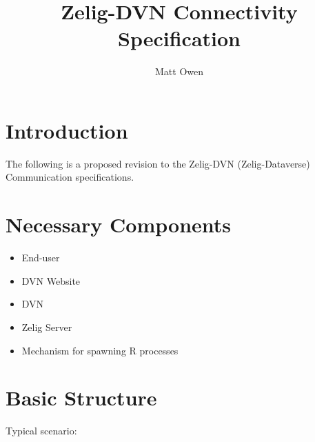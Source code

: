 \documentclass{article}
\title{Zelig-DVN Connectivity Specification}
\author{Matt Owen}
\begin{document}
\maketitle

\section{Introduction}
\label{intro}

The following is a proposed revision to the Zelig-DVN (Zelig-Dataverse) 
Communication specifications.

\section{Necessary Components}
\label{Necessary-Components}

\begin{itemize}
  \item End-user
  \item DVN Website
  \item DVN
  \item Zelig Server
  \item Mechanism for spawning R processes
\end{itemize}

\section{Basic Structure}
\label{Basic Structure}

Typical scenario:
\end{document}
